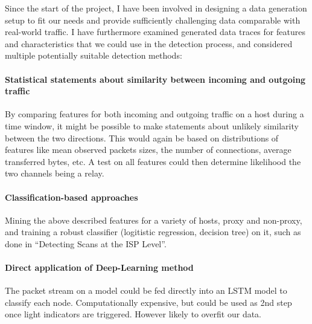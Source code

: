 \documentclass[a4paper,12pt,twoside]{article}
\begin{document}
Since the start of the project, I have been involved in designing a data generation setup to fit our needs and provide sufficiently challenging data comparable with real-world traffic. I have furthermore examined generated data traces for features and characteristics that we could use in the detection process, and considered multiple potentially suitable detection methods:

\paragraph{Statistical statements about similarity between incoming and outgoing traffic}
By comparing features for both incoming and outgoing traffic on a host during a time window, it might be possible to make statements about unlikely similarity between the two directions. This would again be based on distributions of features like mean observed packets sizes, the number of connections, average transferred bytes, etc. A test on all features could then determine likelihood the two channels being a relay.

\paragraph{Classification-based approaches}
Mining the above described features for a variety of hosts, proxy and non-proxy, and training a robust classifier (logitistic regression, decision tree) on it, such as done in “Detecting Scans at the ISP Level”.

\paragraph{Direct application of Deep-Learning method}
The packet stream on a model could be fed directly into an LSTM model to classify each node. Computationally expensive, but could be used as 2nd step once light indicators are triggered.  However likely to overfit our data.
\end{document}
